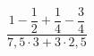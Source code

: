 \begin{ex}[type=calculate]
	\begin{condition}
		\( \dfrac{1-\dfrac{1}{2}+\dfrac{1}{4}-\dfrac{3}{4}}{7,5\cdot3+3\cdot2,5} \)
	\end{condition}
\end{ex}